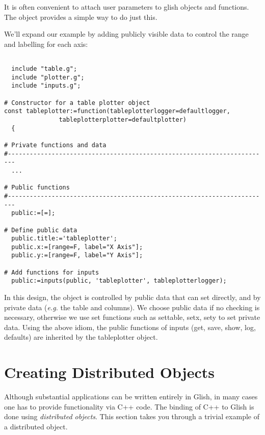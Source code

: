 It is often convenient to attach user parameters to glish
objects and functions. The  object 
provides a simple way to do just this. 

We'll expand our example by adding publicly visible data to
control the range and labelling for each axis:

\begin{verbatim}
  
  include "table.g";
  include "plotter.g";
  include "inputs.g";
  
# Constructor for a table plotter object
const tableplotter:=function(tableplotterlogger=defaultlogger,
		       tableplotterplotter=defaultplotter) 
  {
    
# Private functions and data
#------------------------------------------------------------------------
  ...

# Public functions
#------------------------------------------------------------------------
  public:=[=];

# Define public data
  public.title:='tableplotter';
  public.x:=[range=F, label="X Axis"];
  public.y:=[range=F, label="Y Axis"];
  
# Add functions for inputs
  public:=inputs(public, 'tableplotter', tableplotterlogger);
\end{verbatim}

In this design, the object is controlled by public data that can set
directly, and by private data ({\em e.g.} the table and columns).  We
choose public data if no checking is necessary, otherwise we use set
functions such as settable, setx, sety to set private data. Using the
above idiom, the public functions of inputs (get, save, show, log,
defaults) are inherited by the tableplotter object.




\section{Creating Distributed Objects}
\label{sec:creatingDOs}

Although substantial applications can be written entirely in Glish, in
many cases one has to provide functionality via C++ code.  The binding
of C++ to Glish is done using {\em distributed objects}. This section
takes you through a trivial example of a distributed object.

